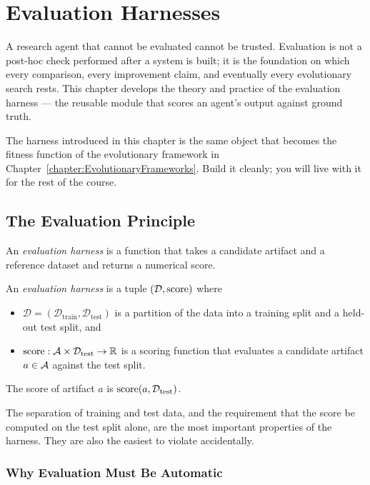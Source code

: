 \chapter{Evaluation Harnesses}
\label{chapter:Evaluation}

A research agent that cannot be evaluated cannot be trusted.
Evaluation is not a post-hoc check performed after a system is built; it is the foundation on which every comparison, every improvement claim, and eventually every evolutionary search rests.
This chapter develops the theory and practice of the evaluation harness — the reusable module that scores an agent's output against ground truth.

The harness introduced in this chapter is the same object that becomes the fitness function of the evolutionary framework in Chapter~\ref{chapter:EvolutionaryFrameworks}.
Build it cleanly; you will live with it for the rest of the course.

\section{The Evaluation Principle}
\label{section:EvaluationPrinciple}

An \emph{evaluation harness} is a function that takes a candidate artifact and a reference dataset and returns a numerical score.
\begin{definition}
\label{definition:EvalHarness}
An \emph{evaluation harness} is a tuple $(\mathcal{D}, \mathrm{score})$ where
\begin{itemize}
\item $\mathcal{D} = (\mathcal{D}_{\mathrm{train}}, \mathcal{D}_{\mathrm{test}})$ is a partition of the data into a training split and a held-out test split, and
\item $\mathrm{score} : \mathcal{A} \times \mathcal{D}_{\mathrm{test}} \to \mathbb{R}$ is a scoring function that evaluates a candidate artifact $a \in \mathcal{A}$ against the test split.
\end{itemize}
The score of artifact $a$ is $\mathrm{score}(a, \mathcal{D}_{\mathrm{test}})$.
\end{definition}

The separation of training and test data, and the requirement that the score be computed on the test split alone, are the most important properties of the harness.
They are also the easiest to violate accidentally.

\subsection{Why Evaluation Must Be Automatic}


